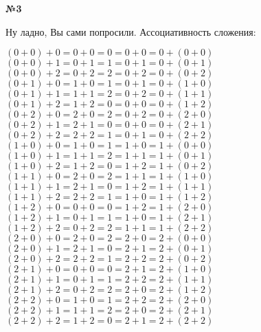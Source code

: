 \documentclass{article}
\newenvironment{task}{\begin{center}\fontsize{14}{14}\selectfont\bf}{\rm\fontsize{12}{12}\selectfont\end{center}}
\begin{document}
	\vspace{10px}
	\begin{task} 
		№3
	\end{task}
	Ну ладно, Вы сами попросили. Ассоциативность сложения: \\
	\begin{center}
		$(0 + 0) + 0 = 0 + 0 = 0 = 0 + 0 = 0 + (0 + 0)$ \\
		$(0 + 0) + 1 = 0 + 1 = 1 = 0 + 1 = 0 + (0 + 1)$ \\
		$(0 + 0) + 2 = 0 + 2 = 2 = 0 + 2 = 0 + (0 + 2)$ \\
		$(0 + 1) + 0 = 1 + 0 = 1 = 0 + 1 = 0 + (1 + 0)$ \\
		$(0 + 1) + 1 = 1 + 1 = 2 = 0 + 2 = 0 + (1 + 1)$ \\
		$(0 + 1) + 2 = 1 + 2 = 0 = 0 + 0 = 0 + (1 + 2)$ \\
		$(0 + 2) + 0 = 2 + 0 = 2 = 0 + 2 = 0 + (2 + 0)$ \\
		$(0 + 2) + 1 = 2 + 1 = 0 = 0 + 0 = 0 + (2 + 1)$ \\
		$(0 + 2) + 2 = 2 + 2 = 1 = 0 + 1 = 0 + (2 + 2)$ \\
		$(1 + 0) + 0 = 1 + 0 = 1 = 1 + 0 = 1 + (0 + 0)$ \\
		$(1 + 0) + 1 = 1 + 1 = 2 = 1 + 1 = 1 + (0 + 1)$ \\
		$(1 + 0) + 2 = 1 + 2 = 0 = 1 + 2 = 1 + (0 + 2)$ \\
		$(1 + 1) + 0 = 2 + 0 = 2 = 1 + 1 = 1 + (1 + 0)$ \\
		$(1 + 1) + 1 = 2 + 1 = 0 = 1 + 2 = 1 + (1 + 1)$ \\
		$(1 + 1) + 2 = 2 + 2 = 1 = 1 + 0 = 1 + (1 + 2)$ \\
		$(1 + 2) + 0 = 0 + 0 = 0 = 1 + 2 = 1 + (2 + 0)$ \\
		$(1 + 2) + 1 = 0 + 1 = 1 = 1 + 0 = 1 + (2 + 1)$ \\
		$(1 + 2) + 2 = 0 + 2 = 2 = 1 + 1 = 1 + (2 + 2)$ \\
		$(2 + 0) + 0 = 2 + 0 = 2 = 2 + 0 = 2 + (0 + 0)$ \\
		$(2 + 0) + 1 = 2 + 1 = 0 = 2 + 1 = 2 + (0 + 1)$ \\
		$(2 + 0) + 2 = 2 + 2 = 1 = 2 + 2 = 2 + (0 + 2)$ \\
		$(2 + 1) + 0 = 0 + 0 = 0 = 2 + 1 = 2 + (1 + 0)$ \\
		$(2 + 1) + 1 = 0 + 1 = 1 = 2 + 2 = 2 + (1 + 1)$ \\
		$(2 + 1) + 2 = 0 + 2 = 2 = 2 + 0 = 2 + (1 + 2)$ \\
		$(2 + 2) + 0 = 1 + 0 = 1 = 2 + 2 = 2 + (2 + 0)$ \\
		$(2 + 2) + 1 = 1 + 1 = 2 = 2 + 0 = 2 + (2 + 1)$ \\
		$(2 + 2) + 2 = 1 + 2 = 0 = 2 + 1 = 2 + (2 + 2)$ \\
	\end{center}
\end{document}
